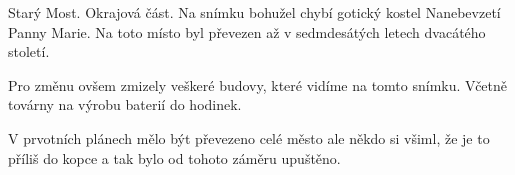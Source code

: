 
Starý Most. Okrajová část. Na snímku bohužel chybí gotický kostel
Nanebevzetí Panny Marie. Na toto místo byl převezen až v sedmdesátých
letech dvacátého století.

Pro změnu ovšem zmizely veškeré budovy, které vidíme na tomto snímku.
Včetně továrny na výrobu baterií do hodinek.

V prvotních plánech mělo být převezeno celé město ale někdo si všiml,
že je to příliš do kopce a tak bylo od tohoto záměru upuštěno.


